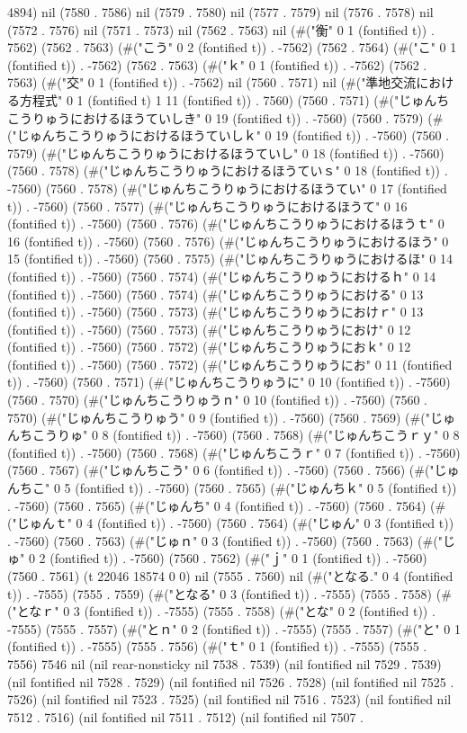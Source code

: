 4894) nil (7580 . 7586) nil (7579 . 7580) nil (7577 . 7579) nil (7576 . 7578) nil (7572 . 7576) nil (7571 . 7573) nil (7562 . 7563) nil (#("衡" 0 1 (fontified t)) . 7562) (7562 . 7563) (#("こう" 0 2 (fontified t)) . -7562) (7562 . 7564) (#("こ" 0 1 (fontified t)) . -7562) (7562 . 7563) (#("ｋ" 0 1 (fontified t)) . -7562) (7562 . 7563) (#("交" 0 1 (fontified t)) . -7562) nil (7560 . 7571) nil (#("準地交流における方程式" 0 1 (fontified t) 1 11 (fontified t)) . 7560) (7560 . 7571) (#("じゅんちこうりゅうにおけるほうていしき" 0 19 (fontified t)) . -7560) (7560 . 7579) (#("じゅんちこうりゅうにおけるほうていしｋ" 0 19 (fontified t)) . -7560) (7560 . 7579) (#("じゅんちこうりゅうにおけるほうていし" 0 18 (fontified t)) . -7560) (7560 . 7578) (#("じゅんちこうりゅうにおけるほうていｓ" 0 18 (fontified t)) . -7560) (7560 . 7578) (#("じゅんちこうりゅうにおけるほうてい" 0 17 (fontified t)) . -7560) (7560 . 7577) (#("じゅんちこうりゅうにおけるほうて" 0 16 (fontified t)) . -7560) (7560 . 7576) (#("じゅんちこうりゅうにおけるほうｔ" 0 16 (fontified t)) . -7560) (7560 . 7576) (#("じゅんちこうりゅうにおけるほう" 0 15 (fontified t)) . -7560) (7560 . 7575) (#("じゅんちこうりゅうにおけるほ" 0 14 (fontified t)) . -7560) (7560 . 7574) (#("じゅんちこうりゅうにおけるｈ" 0 14 (fontified t)) . -7560) (7560 . 7574) (#("じゅんちこうりゅうにおける" 0 13 (fontified t)) . -7560) (7560 . 7573) (#("じゅんちこうりゅうにおけｒ" 0 13 (fontified t)) . -7560) (7560 . 7573) (#("じゅんちこうりゅうにおけ" 0 12 (fontified t)) . -7560) (7560 . 7572) (#("じゅんちこうりゅうにおｋ" 0 12 (fontified t)) . -7560) (7560 . 7572) (#("じゅんちこうりゅうにお" 0 11 (fontified t)) . -7560) (7560 . 7571) (#("じゅんちこうりゅうに" 0 10 (fontified t)) . -7560) (7560 . 7570) (#("じゅんちこうりゅうｎ" 0 10 (fontified t)) . -7560) (7560 . 7570) (#("じゅんちこうりゅう" 0 9 (fontified t)) . -7560) (7560 . 7569) (#("じゅんちこうりゅ" 0 8 (fontified t)) . -7560) (7560 . 7568) (#("じゅんちこうｒｙ" 0 8 (fontified t)) . -7560) (7560 . 7568) (#("じゅんちこうｒ" 0 7 (fontified t)) . -7560) (7560 . 7567) (#("じゅんちこう" 0 6 (fontified t)) . -7560) (7560 . 7566) (#("じゅんちこ" 0 5 (fontified t)) . -7560) (7560 . 7565) (#("じゅんちｋ" 0 5 (fontified t)) . -7560) (7560 . 7565) (#("じゅんち" 0 4 (fontified t)) . -7560) (7560 . 7564) (#("じゅんｔ" 0 4 (fontified t)) . -7560) (7560 . 7564) (#("じゅん" 0 3 (fontified t)) . -7560) (7560 . 7563) (#("じゅｎ" 0 3 (fontified t)) . -7560) (7560 . 7563) (#("じゅ" 0 2 (fontified t)) . -7560) (7560 . 7562) (#("ｊ" 0 1 (fontified t)) . -7560) (7560 . 7561) (t 22046 18574 0 0) nil (7555 . 7560) nil (#("となる." 0 4 (fontified t)) . -7555) (7555 . 7559) (#("となる" 0 3 (fontified t)) . -7555) (7555 . 7558) (#("となｒ" 0 3 (fontified t)) . -7555) (7555 . 7558) (#("とな" 0 2 (fontified t)) . -7555) (7555 . 7557) (#("とｎ" 0 2 (fontified t)) . -7555) (7555 . 7557) (#("と" 0 1 (fontified t)) . -7555) (7555 . 7556) (#("ｔ" 0 1 (fontified t)) . -7555) (7555 . 7556) 7546 nil (nil rear-nonsticky nil 7538 . 7539) (nil fontified nil 7529 . 7539) (nil fontified nil 7528 . 7529) (nil fontified nil 7526 . 7528) (nil fontified nil 7525 . 7526) (nil fontified nil 7523 . 7525) (nil fontified nil 7516 . 7523) (nil fontified nil 7512 . 7516) (nil fontified nil 7511 . 7512) (nil fontified nil 7507 . 